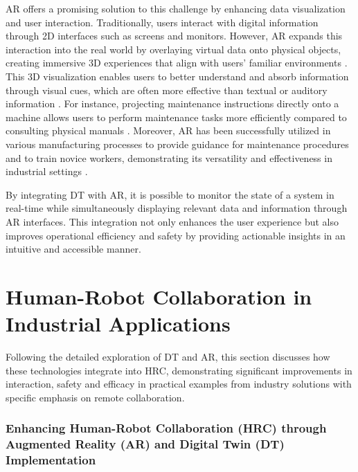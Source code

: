 \ac{AR} offers a promising solution to this challenge by enhancing data visualization and user interaction. Traditionally, users interact with digital 
information through 2D interfaces such as screens and monitors. However, \ac{AR} expands this interaction into the real world by overlaying virtual 
data onto physical objects, creating immersive 3D experiences that align with users' familiar environments \cite{peddie2017augmented}. This 3D visualization enables
users to better understand and absorb information through visual cues, which are often more effective than textual or auditory information \cite{article-teaching}.
For instance, projecting maintenance instructions directly onto a machine allows users to perform maintenance tasks more efficiently compared to 
consulting physical manuals \cite{inproceedings}. Moreover, \ac{AR} has been successfully utilized in various manufacturing processes to provide guidance 
for maintenance procedures and to train novice workers, demonstrating its versatility and effectiveness in industrial settings \cite{ong2004virtual}.

By integrating \ac{DT} with \ac{AR}, it is possible to monitor the state of a system in real-time while simultaneously displaying relevant
data and information through \ac{AR} interfaces. This integration not only enhances the user experience but also improves operational efficiency and 
safety by providing actionable insights in an intuitive and accessible manner.

\section{Human-Robot Collaboration in Industrial Applications}
Following the detailed exploration of \ac{DT} and \ac{AR}, this section discusses how these technologies integrate into \ac{HRC}, demonstrating significant improvements in interaction, safety and efficacy in practical examples from industry solutions with specific emphasis on remote collaboration.

\subsubsection{Enhancing Human-Robot Collaboration (\ac{HRC}) through Augmented Reality (\ac{AR}) and Digital Twin (\ac{DT}) Implementation}

